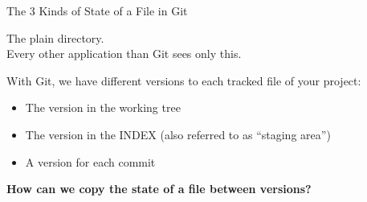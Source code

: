 \begin{frame}{The 3 Kinds of State of a File in Git}
\begin{tikzpicture}[outer sep=1]
  \end{tikzpicture}

  \begin{minipage}[b][3cm][b]{1.0\textwidth}
   {
    The plain directory.\\
    Every other application than Git sees only this.}
   {
    With Git, we have different versions to each tracked file of your project:
    \begin{itemize}
      \item The version in the working tree
      \item The version in the INDEX (also referred to as ``staging area'')
      \item A version for each commit
    \end{itemize}


    \textbf{How can we copy the state of a file between versions?}
  }



  \end{minipage}
\end{frame}
